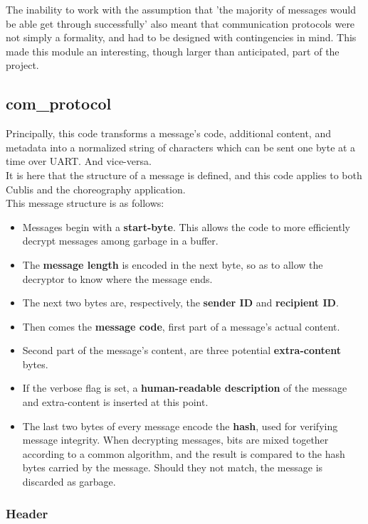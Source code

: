 The inability to work with the assumption that 'the majority of messages would be able get through successfully' also meant that communication protocols were not simply a formality, and had to be designed with contingencies in mind. This made this module an interesting, though larger than anticipated, part of the project.

\subsection{com\_protocol}

Principally, this code transforms a message's code, additional content, and metadata into a normalized string of characters which can be sent one byte at a time over UART. And vice-versa.\\

It is here that the structure of a message is defined, and this code applies to both Cublis and the choreography application.\\

This message structure is as follows:
\begin{itemize}
\item[] Messages begin with a \textbf{start-byte}. This allows the code to more efficiently decrypt messages among garbage in a buffer.
\item[] The \textbf{message length} is encoded in the next byte, so as to allow the decryptor to know where the message ends.
\item[] The next two bytes are, respectively, the \textbf{sender ID} and \textbf{recipient ID}.
\item[] Then comes the \textbf{message code}, first part of a message's actual content.
\item[] Second part of the message's content, are three potential \textbf{extra-content} bytes.
\item[] If the verbose flag is set, a \textbf{human-readable description} of the message and extra-content is inserted at this point.
\item[] The last two bytes of every message encode the \textbf{hash}, used for verifying message integrity. When decrypting messages, bits are mixed together according to a common algorithm, and the result is compared to the hash bytes carried by the message. Should they not match, the message is discarded as garbage.
\end{itemize}

\subsubsection{Header}

